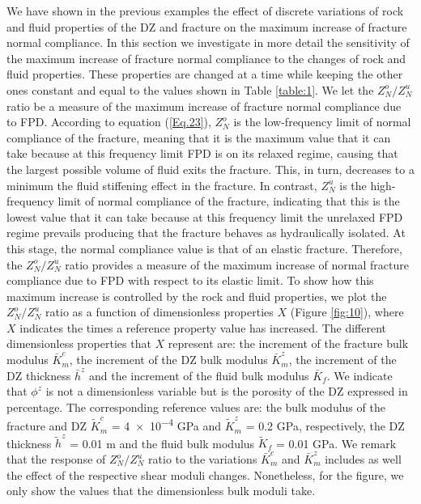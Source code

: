 \documentclass[draft]{agujournal2019}
\begin{document}
We have shown in the previous examples the effect of discrete variations of rock and fluid properties of the DZ and fracture on the maximum increase of fracture normal compliance. In this section we investigate in more detail the sensitivity of the maximum increase of fracture normal compliance to the  changes of rock and fluid properties. These properties are changed at a time while keeping the other ones constant and equal to the values shown in Table \ref{table:1}.
We let the $Z_N^o/Z_N^u$ ratio be a measure of the maximum increase of fracture normal compliance due to FPD. According to equation (\ref{Eq.23}), $Z_N^o$ is the low-frequency limit of normal compliance of the fracture, meaning that it is the maximum value that it can take because at this frequency limit FPD is on its relaxed regime,  causing that the largest possible volume of fluid exits the fracture. This, in turn, decreases to a minimum the fluid stiffening effect in the fracture. In contrast, $Z_N^u$ is the high-frequency limit of normal compliance of the fracture, indicating that this is the lowest value that it can take because at this frequency limit the unrelaxed FPD regime prevails producing that the fracture behaves as hydraulically isolated. At this stage, the normal compliance value is that of an elastic fracture. Therefore, the  $Z_N^o/Z_N^u$ ratio provides a measure of the maximum increase of normal fracture compliance due to FPD  with respect to its elastic limit. To show how this maximum increase is controlled by the rock and fluid properties, we plot the $Z_N^o/Z_N^u$ ratio as a function of dimensionless properties $X$ (Figure \ref{fig:10}), where $X$ indicates the times a reference property value has increased. The different dimensionless properties that $X$ represent are: the increment of the fracture bulk modulus $\bar{K}_m^c$, the increment of the DZ bulk modulus $\bar{K}_m^z $, the increment of the DZ thickness $\bar{h}^z$ and the increment of the fluid bulk modulus $\bar{K}_f$. We indicate that $\phi^z$ is not a dimensionless variable but is the porosity of the DZ expressed in percentage. The corresponding reference values are: the bulk modulus of the fracture and DZ $\tilde{K}_m^c$ = \num{4e-4} GPa and $\tilde{K}_m^z$ = 0.2 GPa, respectively, the DZ thickness $\tilde{h}^z$ = 0.01 m and the fluid bulk modulus $\tilde{K}_f$ = 0.01 GPa.
We remark that the response of $Z_N^o/Z_N^u$ ratio to the variations $\bar{K}_m^c$ and $\bar{K}_m^z$ includes as well the effect of the respective shear moduli changes. Nonetheless, for the figure,  we only show the values that the dimensionless bulk moduli take.
\end{document}

